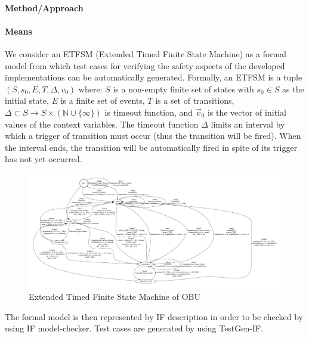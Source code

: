 \documentclass{template/openetcs_article}
\begin{document}
\paragraph{Method/Approach}


\paragraph{Means}

We consider an ETFSM (Extended Timed Finite State Machine) as a formal model
from which test cases for verifying the safety aspects of the developed
implementations can be automatically generated.
Formally, 
    an ETFSM is a tuple 
    $(S, s_0, E, T,  \Delta, v_0)$ where:
    $S$ is a non-empty finite set of states with $s_0 \in S$ as the
        initial state,
 $E$ is a finite set of events,
 $T$ is a set of transitions, 
 $\Delta \subset S \to S \times (\mathbb{N} \cup \{ \infty \})$ is timeout function, and
 $\vec{v}_0$ is the vector of initial values of the context variables.
The timeout function $\Delta$ limits an interval by which a trigger of
transition must occur (thus the transition will be fired). 
When the interval ends, the transition will be automatically fired in spite of
its trigger has not yet occurred.


\begin{figure}[!htbp]
\begin{center}
  \includegraphics[width=24.5cm, angle=90]{figures/if-model.pdf}
  \caption{Extended Timed Finite State Machine of OBU}
  \label{fig:model}
\end{center}
\end{figure}



The formal model is then represented by IF description%
in order to be checked by using IF model-checker.
Test cases are generated by using TestGen-IF.
\end{document}
